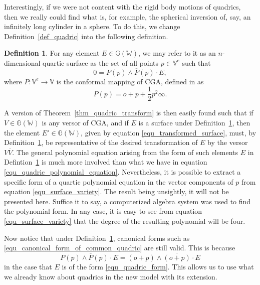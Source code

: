 \documentclass{birkjour}
\theoremstyle{definition}
\newtheorem{defn}[thm]{Definition}
\theoremstyle{remark}
\numberwithin{equation}{section}
\newcommand{\G}{\mathbb{G}}
\newcommand{\V}{\mathbb{V}}
\newcommand{\W}{\mathbb{W}}
\newcommand{\nvao}{o}
\newcommand{\nvai}{\infty}
\begin{document}
Interestingly, if we were not content with the rigid body motions of
quadrics, then we really could find what is, for example, the spherical
inversion of, say, an infinitely long cylinder in a sphere.  To do this, we change
Definition~\ref{def_quadric} into the following definition.
\begin{defn}\label{def_surface}
For any element $E\in\G(\W)$, we may refer to it as an $n$-dimensional
quartic surface as the set of all points $p\in\V^e$ such that
\begin{equation}\label{equ_surface_variety}
0 = P(p)\wedge\overline{P}(p)\cdot E,
\end{equation}
where $P:\V^e\to\V$ is the conformal mapping of CGA, defined in \cite{} as
\begin{equation}
P(p) = \nvao + p + \frac{1}{2}p^2\nvai.
\end{equation}
\end{defn}
A version of Theorem~\ref{thm_quadric_transform} is then easily found
such that if $V\in\G(\W)$ is any versor of CGA, and if $E$
is a surface under Definition~\ref{def_surface}, then the element $E'\in\G(\W)$,
given by equation \eqref{equ_transformed_surface}, must, by Definition~\ref{def_surface},
 be representative of the desired transformation of $E$ by the versor $V\overline{V}$.
The general polynomial equation arising from the form of
such elements $E$ in Defintion~\ref{def_surface} is much more involved than
what we have in equation \eqref{equ_quadric_polynomial_equation}.  Nevertheless, it is possible to extract
a specific form of a quartic polynomial equation in
the vector components of $p$ from equation \eqref{equ_surface_variety}.
The result being unsightly, it will not be presented here.  Suffice it to say, a computerized
algebra system was used to find the polynomial form.  In any case, it is easy
to see from equation \eqref{equ_surface_variety} that the degree of the resulting
polynomial will be four.

Now notice that under Definition~\ref{def_surface}, canonical forms
such as \eqref{equ_canonical_form_of_common_quadric} are still valid.
This is because
\begin{equation}
P(p)\wedge\overline{P}(p)\cdot E = (\nvao+p)\wedge\overline{(\nvao+p)}\cdot E
\end{equation}
in the case that $E$ is of the form \eqref{equ_quadric_form}.  This allows
us to use what we already know about quadrics in the new model with its extension.
\end{document}
